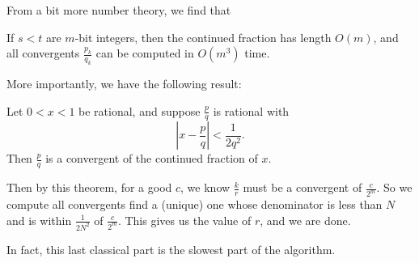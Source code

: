 \documentclass[a4paper]{article}
\begin{document}
From a bit more number theory, we find that
\begin{fact}
  If $s < t$ are $m$-bit integers, then the continued fraction has length $O(m)$, and all convergents $\frac{p_k}{q_k}$ can be computed in $O(m^3)$ time.
\end{fact}

More importantly, we have the following result:
\begin{fact}
  Let $0 < x < 1$ be rational, and suppose $\frac{p}{q}$ is rational with
  \[
    \left|x - \frac{p}{q}\right| < \frac{1}{2q^2}.
  \]
  Then $\frac{p}{q}$ is a convergent of the continued fraction of $x$.
\end{fact}

Then by this theorem, for a good $c$, we know $\frac{k}{r}$ must be a convergent of $\frac{c}{2^m}$. So we compute all convergents find a (unique) one whose denominator is less than $N$ and is within $\frac{1}{2N^2}$ of $\frac{c}{2^m}$. This gives us the value of $r$, and we are done.

In fact, this last classical part is the slowest part of the algorithm.
\end{document}
